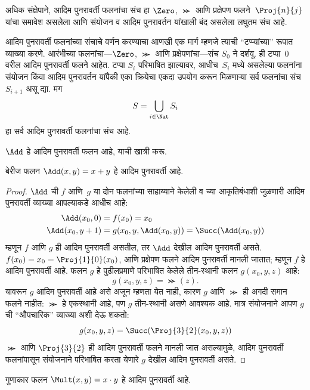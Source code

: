 \documentclass[../../../include/open-logic-section]{subfiles}
\begin{document}
\begin{explain}
अधिक संक्षेपाने, आदिम पुनरावर्ती फलनांचा संच हा $\Zero$, $\Succ$ आणि
प्रक्षेपण फलने~$\Proj{n}{j}$ यांचा समावेश असलेला आणि संयोजन व आदिम
पुनरावर्तन यांखाली बंद असलेला लघुतम संच आहे.

आदिम पुनरावर्ती फलनांच्या संचाचे वर्णन करण्याचा आणखी एक मार्ग म्हणजे
त्याची ``टप्प्यांच्या'' रूपात व्याख्या करणे. आरंभीच्या फलनांचा---$\Zero$,
$\Succ$ आणि प्रक्षेपणांचा---संच $S_0$ ने दर्शवू. ही टप्पा~$0$ वरील
आदिम पुनरावर्ती फलने आहेत. टप्पा $S_i$ परिभाषित झाल्यावर, आधीच~$S_i$
मध्ये असलेल्या फलनांना संयोजन किंवा आदिम पुनरावर्तन यांपैकी एका क्रियेचा
एकदा उपयोग करून मिळणाऱ्या सर्व फलनांचा संच $S_{i+1}$ असू द्या. मग
\[
S = \bigcup_{i \in \Nat} S_i
\]
हा सर्व आदिम पुनरावर्ती फलनांचा संच आहे.
\end{explain}

$\Add$ हे आदिम पुनरावर्ती फलन आहे, याची खात्री करू.

\begin{prop}
  बेरीज फलन $\Add(x,y) = x+y$ हे आदिम पुनरावर्ती आहे.
\end{prop}

\begin{proof}
$\Add$ ची $f$ आणि~$g$ या दोन फलनांच्या साहाय्याने केलेली व
 च्या आकृतिबंधाशी जुळणारी आदिम
पुनरावर्ती व्याख्या आपल्याकडे आधीच आहे:
\begin{align*}
  \Add(x_0, 0) & = f(x_0) = x_0\\
  \Add(x_0, y+1) & = g(x_0, y, \Add(x_0, y)) =
  \Succ(\Add(x_0, y))
\end{align*}
म्हणून $f$ आणि $g$ ही आदिम पुनरावर्ती असतील, तर $\Add$ देखील आदिम
पुनरावर्ती असते. $f(x_0) = x_0 = \Proj{1}{0}(x_0)$, आणि प्रक्षेपण
फलने आदिम पुनरावर्ती मानली जातात; म्हणून $f$ हे आदिम पुनरावर्ती आहे.
फलन $g$ हे पुढीलप्रमाणे परिभाषित केलेले तीन-स्थानी फलन $g(x_0, y, z)$ आहे:
\[
g(x_0, y, z) = \Succ(z).
\]
यावरून $g$ आदिम पुनरावर्ती आहे असे अजून म्हणता येत नाही, कारण $g$ आणि
$\Succ$ ही अगदी समान फलने नाहीत: $\Succ$ हे एकस्थानी आहे, पण $g$ तीन-स्थानी
असणे आवश्यक आहे. मात्र संयोजनाने आपण $g$ ची ``औपचारिक'' व्याख्या अशी
देऊ शकतो:
\[
g(x_0, y, z) = \Succ(\Proj{3}{2}(x_0, y, z))
\]
$\Succ$ आणि $\Proj{3}{2}$ ही आदिम पुनरावर्ती फलने मानली जात असल्यामुळे,
आदिम पुनरावर्ती फलनांपासून संयोजनाने परिभाषित करता येणारे $g$ देखील आदिम
पुनरावर्ती असते.
\end{proof}

\begin{prop}
  गुणाकार फलन $\Mult(x,y) = x \cdot y$ हे आदिम पुनरावर्ती आहे.
\end{prop}
\end{document}
